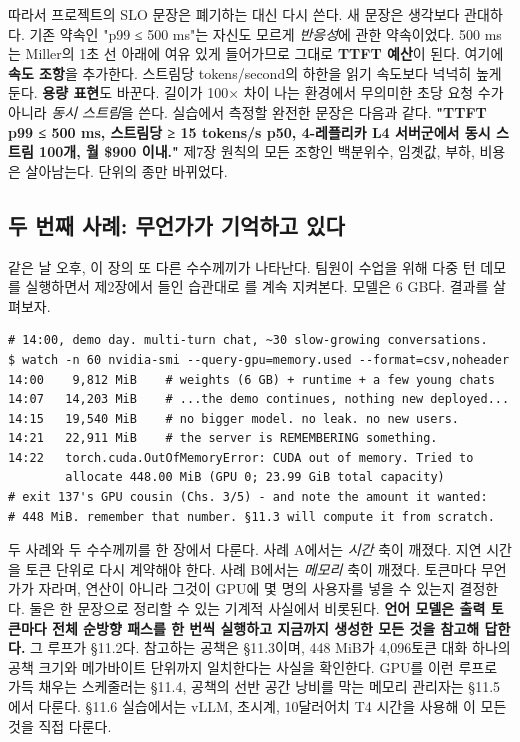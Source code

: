 따라서 프로젝트의 SLO 문장은 폐기하는 대신 다시 쓴다. 새 문장은 생각보다 관대하다. 기존 약속인 "p99 ≤ 500 ms"는 자신도 모르게 \textit{반응성}에 관한 약속이었다. 500 ms는 Miller의 1초 선 아래에 여유 있게 들어가므로 그대로 \textbf{TTFT 예산}이 된다. 여기에 \textbf{속도 조항}을 추가한다. 스트림당 tokens/second의 하한을 읽기 속도보다 넉넉히 높게 둔다. \textbf{용량 표현}도 바꾼다. 길이가 100× 차이 나는 환경에서 무의미한 초당 요청 수가 아니라 \textit{동시 스트림}을 쓴다. 실습에서 측정할 완전한 문장은 다음과 같다. \textbf{"TTFT p99 ≤ 500 ms, 스트림당 ≥ 15 tokens/s p50, 4-레플리카 L4 서버군에서 동시 스트림 100개, 월 \$900 이내."} 제7장 원칙의 모든 조항인 백분위수, 임곗값, 부하, 비용은 살아남는다. 단위의 종만 바뀌었다.

\subsection*{두 번째 사례: 무언가가 기억하고 있다}

같은 날 오후, 이 장의 또 다른 수수께끼가 나타난다. 팀원이 수업을 위해 다중 턴 데모를 실행하면서 제2장에서 들인 습관대로 를 계속 지켜본다. 모델은 6 GB다. 결과를 살펴보자.

\begin{terminalbox}
\begin{Verbatim}[breaklines=true,breakanywhere=true,fontsize=\small,formatcom=\color{tbbtermfg},codes=\tbbcodeactive]
# 14:00, demo day. multi-turn chat, ~30 slow-growing conversations.
$ watch -n 60 nvidia-smi --query-gpu=memory.used --format=csv,noheader
14:00    9,812 MiB    # weights (6 GB) + runtime + a few young chats
14:07   14,203 MiB    # ...the demo continues, nothing new deployed...
14:15   19,540 MiB    # no bigger model. no leak. no new users.
14:21   22,911 MiB    # the server is REMEMBERING something.
14:22   torch.cuda.OutOfMemoryError: CUDA out of memory. Tried to
        allocate 448.00 MiB (GPU 0; 23.99 GiB total capacity)
# exit 137's GPU cousin (Chs. 3/5) - and note the amount it wanted:
# 448 MiB. remember that number. §11.3 will compute it from scratch.
\end{Verbatim}
\end{terminalbox}

두 사례와 두 수수께끼를 한 장에서 다룬다. 사례 A에서는 \textit{시간} 축이 깨졌다. 지연 시간을 토큰 단위로 다시 계약해야 한다. 사례 B에서는 \textit{메모리} 축이 깨졌다. 토큰마다 무언가가 자라며, 연산이 아니라 그것이 GPU에 몇 명의 사용자를 넣을 수 있는지 결정한다. 둘은 한 문장으로 정리할 수 있는 기계적 사실에서 비롯된다. \textbf{언어 모델은 출력 토큰마다 전체 순방향 패스를 한 번씩 실행하고 지금까지 생성한 모든 것을 참고해 답한다.} 그 루프가 §11.2다. 참고하는 공책은 §11.3이며, 448 MiB가 4,096토큰 대화 하나의 공책 크기와 메가바이트 단위까지 일치한다는 사실을 확인한다. GPU를 이런 루프로 가득 채우는 스케줄러는 §11.4, 공책의 선반 공간 낭비를 막는 메모리 관리자는 §11.5에서 다룬다. §11.6 실습에서는 vLLM, 초시계, 10달러어치 T4 시간을 사용해 이 모든 것을 직접 다룬다.

